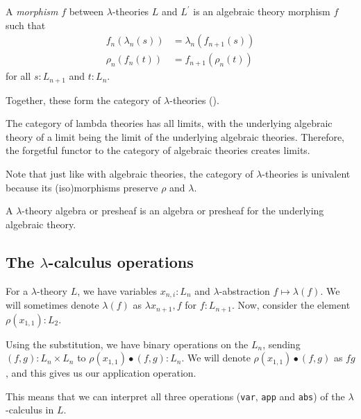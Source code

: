 \begin{definition}
  A \textit{morphism} $ f $ between $ \lambda $-theories $ L $ and $ L^\prime $ is an algebraic theory morphism $ f $ such that
  \begin{align*}
    f_n(\lambda_n(s)) &= \lambda_n(f_{n + 1}(s))\\
    \rho_n(f_n(t)) &= f_{n + 1}(\rho_n(t))
  \end{align*}
  for all $ s: L_{n + 1} $ and $ t: L_n $.
\end{definition}

Together, these form the category of $ \lambda $-theories \iindex{$ \LamTh $} ().

\begin{lemma}
  The category of lambda theories has all limits, with the underlying algebraic theory of a limit being the limit of the underlying algebraic theories. Therefore, the forgetful functor to the category of algebraic theories creates limits.
\end{lemma}

\begin{lemma}
  Note that just like with algebraic theories, the category of $ \lambda $-theories is univalent because its (iso)morphisms preserve $ \rho $ and $ \lambda $.
\end{lemma}

\begin{definition}
  A $ \lambda $-theory algebra or presheaf is an algebra or presheaf for the underlying algebraic theory.
\end{definition}

\subsection{The $ \lambda $-calculus operations}\label{subsec:lambda-calculus-operations}
For a $ \lambda $-theory $ L $, we have variables $ x_{n, i} : L_n $ and $ \lambda $-abstraction $ f \mapsto \lambda(f) $. We will sometimes denote $ \lambda(f) $ as $ \lambda x_{n + 1}, f $ for $ f: L_{n + 1} $. Now, consider the element $ \rho(x_{1, 1}) : L_2 $.
\begin{definition}
  Using the substitution, we have binary operations on the $ L_n $, sending $ (f, g) : L_n \times L_n $ to $ \rho(x_{1, 1}) \bullet (f, g) : L_n $. We will denote $ \rho(x_{1, 1}) \bullet (f, g) $ as $ f g $, and this gives us our application operation.
\end{definition}
This means that we can interpret all three operations (\texttt{var}, \texttt{app} and \texttt{abs}) of the $ \lambda $-calculus in $ L $.

